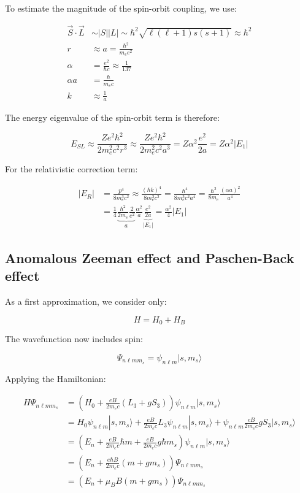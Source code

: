 \documentclass[italian]{HKNdocument}
\begin{document}
To estimate the magnitude of the spin-orbit coupling, we use:

\begin{align}
\vec{S}\cdot\vec{L} &\sim |S||L| \sim \hbar^2\sqrt{\ell(\ell+1)s(s+1)} \approx \hbar^2 \\
r &\approx a=\frac{\hbar^2}{m_e e^2} \\
\alpha &= \frac{e^2}{\hbar c} \approx \frac{1}{137} \\
\alpha a &= \frac{\hbar}{m_e c} \\
k &\approx \frac{1}{a}
\end{align}

The energy eigenvalue of the spin-orbit term is therefore:

\begin{equation}
E_{SL} \approx \frac{Ze^2\hbar^2}{2m_e^2c^2r^3} \approx \frac{Ze^2\hbar^2}{2m_e^2c^2a^3}=Z\alpha^2\frac{e^2}{2a}=Z\alpha^2|E_1|
\end{equation}

For the relativistic correction term:

\begin{align}
|E_R| &= \frac{p^4}{8m_e^3c^2} \approx \frac{(\hbar k)^4}{8m_e^3c^2}=\frac{\hbar^4}{8m_e^3c^2a^4}=\frac{\hbar^2}{8m_e}\frac{(\alpha a)^2}{a^4}\\
&= \frac{1}{4}\underbrace{\frac{\hbar^2}{2m_e}\frac{2}{e^2}}_a\frac{\alpha^2}{a}\underbrace{\frac{e^2}{2a}}_{|E_1|}=\frac{\alpha^2}{4}|E_1|
\end{align}

\subsection{Anomalous Zeeman effect and Paschen-Back effect}
As a first approximation, we consider only:

\begin{equation}
H=H_0+H_B
\end{equation}

The wavefunction now includes spin:

\begin{equation}
\Psi_{n\ell mm_s}=\psi_{n\ell m}|s,m_s\rangle
\end{equation}

Applying the Hamiltonian:

\begin{align}
H\Psi_{n\ell mm_s} &= (H_0+\frac{eB}{2m_e c}(L_3+gS_3))\psi_{n\ell m}|s,m_s\rangle\\
&= H_0\psi_{n\ell m}|s,m_s\rangle+\frac{eB}{2m_e c}L_3\psi_{n\ell m}|s,m_s\rangle+\psi_{n\ell m}\frac{eB}{2m_e c}gS_3|s,m_s\rangle\\
&= (E_n+\frac{eB}{2m_e c}\hbar m+\frac{eB}{2m_e c}g\hbar m_s)\psi_{n\ell m}|s,m_s\rangle\\
&= (E_n+\frac{e\hbar B}{2m_e c}(m+gm_s))\Psi_{n\ell mm_s}\\
&= (E_n+\mu_B B(m+gm_s))\Psi_{n\ell mm_s}
\end{align}
\end{document}
